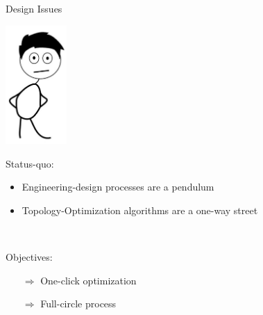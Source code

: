 \begin{frame}{Design Issues}
	
	\includegraphics[width=0.175\textwidth, center]{Pictures/animations/animation_designer_sad}
	
	\begin{multicols}{2}
		\begin{block}{Status-quo:}{
		\begin{itemize}		
			\item Engineering-design processes are a pendulum
			\item Topology-Optimization algorithms are a one-way street
		\end{itemize}~\\
		}
		\end{block}
		\columnbreak

		\begin{block}{Objectives:}{
		\begin{itemize}		
			\item[$\Rightarrow$] One-click optimization
		\end{itemize}
		\begin{itemize}		
			\item[$\Rightarrow$] Full-circle process
		\end{itemize}
		}
		\end{block}
				
		\end{multicols}

\end{frame}	

